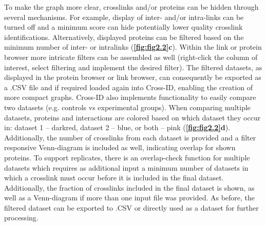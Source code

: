 To make the graph more clear, crosslinks and/or proteins can be hidden through several mechanisms. For example, display of inter- and/or intra-links can be turned off and a minimum score can hide potentially lower quality crosslink identifications. Alternatively, displayed proteins can be filtered based on the minimum number of inter- or intralinks (\textbf{\autoref{fig:fig2.2}c}). Within the link or protein browser more intricate filters can be assembled as well (right-click the column of interest, select filtering and implement the desired filter). The filtered datasets, as displayed in the protein browser or link browser, can consequently be exported as a .CSV file and if required loaded again into Cross-ID, enabling the creation of more compact graphs. Cross-ID also implements functionality to easily compare two datasets (e.g. controls vs experimental groups). When comparing multiple datasets, proteins and interactions are colored based on which dataset they occur in: dataset 1 – darkred, dataset 2 – blue, or both – pink (\textbf{\autoref{fig:fig2.2}d}). Additionally, the number of crosslinks from each dataset is provided and a filter responsive Venn-diagram is included as well, indicating overlap for shown proteins. To support replicates, there is an overlap-check function for multiple datasets which requires as additional input a minimum number of datasets in which a crosslink must occur before it is included in the final dataset. Additionally, the fraction of crosslinks included in the final dataset is shown, as well as a Venn-diagram if more than one input file was provided. As before, the filtered dataset can be exported to .CSV or directly used as a dataset for further processing.


